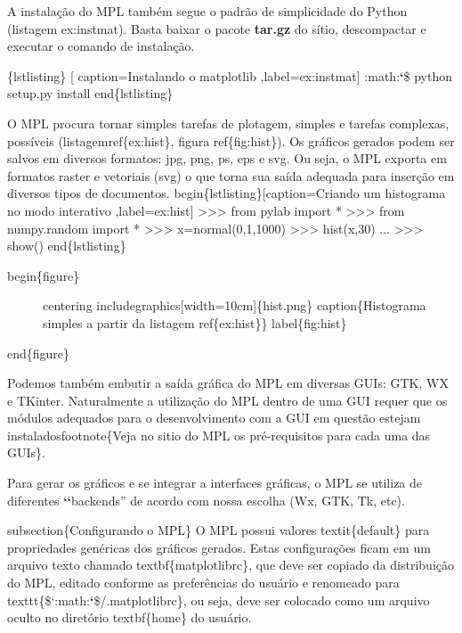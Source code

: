 \documentclass[a4paper,10pt,brazil]{sphinxmanual}
\begin{document}
A instalação do MPL também segue o padrão de simplicidade do Python
(listagem ex:instmat). Basta baixar o pacote \textbf{tar.gz} do sítio,
descompactar e executar o comando de instalação.

\{lstlisting\} {[} caption=Instalando o matplotlib ,label=ex:instmat{]}
:math:{\color{red}\bfseries{}{}`}\$ python setup.py install
end\{lstlisting\}

O MPL procura tornar simples tarefas de plotagem, simples e tarefas complexas, possíveis (listagemref\{ex:hist\}, figura ref\{fig:hist\}). Os gráficos gerados podem ser salvos em diversos formatos: jpg, png, ps, eps e svg. Ou seja, o MPL exporta em formatos raster e vetoriais (svg) o que torna sua saída adequada para inserção em diversos tipos de documentos.
begin\{lstlisting\}{[}caption=Criando um histograma no modo interativo ,label=ex:hist{]}
\textgreater{}\textgreater{}\textgreater{} from pylab import *
\textgreater{}\textgreater{}\textgreater{} from numpy.random import *
\textgreater{}\textgreater{}\textgreater{} x=normal(0,1,1000)
\textgreater{}\textgreater{}\textgreater{} hist(x,30)
...
\textgreater{}\textgreater{}\textgreater{} show()
end\{lstlisting\}
\begin{description}
\item[{begin\{figure\}}] \leavevmode
centering
includegraphics{[}width=10cm{]}\{hist.png\}
caption\{Histograma simples a partir da listagem ref\{ex:hist\}\}
label\{fig:hist\}

\end{description}

end\{figure\}

Podemos também embutir a saída gráfica do MPL em diversas GUIs: GTK, WX e TKinter. Naturalmente a utilização do MPL dentro de uma GUI requer que os módulos adequados para o desenvolvimento com a GUI em questão estejam instaladosfootnote\{Veja no sitio do MPL os pré-requisitos para cada uma das GUIs\}.

Para gerar os gráficos e se integrar a interfaces gráficas, o MPL se utiliza de diferentes {\color{red}\bfseries{}{}`{}`}backends'' de acordo com nossa escolha (Wx, GTK, Tk, etc).

subsection\{Configurando o MPL\}
O MPL possui valores textit\{default\} para propriedades genéricas dos gráficos gerados. Estas configurações ficam em um arquivo texto chamado textbf\{matplotlibrc\}, que deve ser copiado da distribuição do MPL, editado conforme as preferências do usuário e renomeado para texttt\{\${}`:math:{\color{red}\bfseries{}{}`}\$/.matplotlibrc\}, ou seja, deve ser colocado como um arquivo oculto no diretório textbf\{home\} do usuário.
\end{document}
